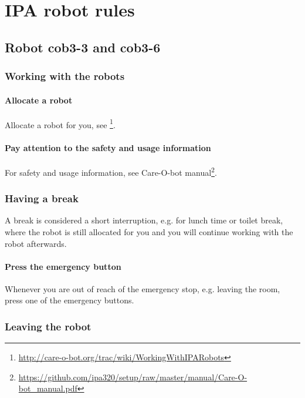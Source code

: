 \chapter{IPA robot rules}\label{chap:robot-rules}


\section{Robot cob3-3 and cob3-6}

\subsection{Working with the robots}

\subsubsection{Allocate a robot}
Allocate a robot for you, see \footnote{\url{http://care-o-bot.org/trac/wiki/WorkingWithIPARobots}}. 

\subsubsection{Pay attention to the safety and usage information}
For safety and usage information, see Care-O-bot manual\footnote{\url{https://github.com/ipa320/setup/raw/master/manual/Care-O-bot_manual.pdf}}.

\subsection{Having a break}
A break is considered a short interruption, e.g. for lunch time or toilet break, where the robot is still allocated for you and you will continue working with the robot afterwards.

\subsubsection{Press the emergency button}
Whenever you are out of reach of the emergency stop, e.g. leaving the room, press one of the emergency buttons.

\subsection{Leaving the robot}

